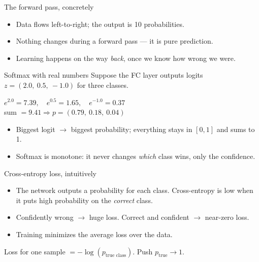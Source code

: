 \documentclass[10pt,aspectratio=169]{beamer}
\begin{document}
\begin{frame}{The forward pass, concretely}
  \begin{center}
  \end{center}
  \begin{itemize}
    \item Data flows left-to-right; the output is 10 probabilities.
    \item Nothing changes during a forward pass --- it is pure prediction.
    \item Learning happens on the way \emph{back}, once we know how wrong we were.
  \end{itemize}
\end{frame}

\begin{frame}{Softmax with real numbers}
  Suppose the FC layer outputs logits $z = (2.0,\ 0.5,\ -1.0)$ for three classes.
  \begin{mathbox}
    $e^{2.0}=7.39,\quad e^{0.5}=1.65,\quad e^{-1.0}=0.37$\\[3pt]
    sum $=9.41 \Rightarrow p=(0.79,\ 0.18,\ 0.04)$
  \end{mathbox}
  \begin{itemize}
    \item Biggest logit $\rightarrow$ biggest probability; everything stays in $[0,1]$ and sums to 1.
    \item Softmax is monotone: it never changes \emph{which} class wins, only the confidence.
  \end{itemize}
\end{frame}

\begin{frame}{Cross-entropy loss, intuitively}
  \begin{itemize}
    \item The network outputs a probability for each class. Cross-entropy is low when it puts high
          probability on the \emph{correct} class.
    \item Confidently wrong $\rightarrow$ huge loss. Correct and confident $\rightarrow$ near-zero loss.
    \item Training minimizes the average loss over the data.
  \end{itemize}
  \begin{mathbox}
    Loss for one sample $= -\log(p_{\text{true class}})$. Push $p_{\text{true}}\to 1$.
  \end{mathbox}
\end{frame}
\end{document}
